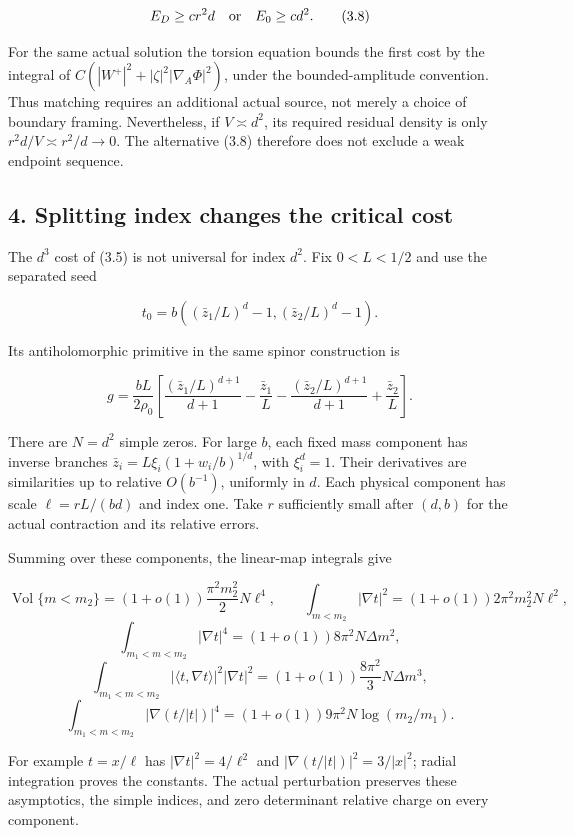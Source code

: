 \documentclass[
  11pt,
]{article}
\begin{document}
\[
 E_D\ge c r^2d\quad\hbox{or}\quad E_0\ge c d^2.
 \tag{3.8}
\]

For the same actual solution the torsion equation bounds the first cost
by the integral of \(C(|W^+|^2+|\zeta|^2|\nabla_A\Phi|^2)\), under the
bounded-amplitude convention. Thus matching requires an additional
actual source, not merely a choice of boundary framing. Nevertheless, if
\(V\asymp d^2\), its required residual density is only
\(r^2d/V\asymp r^2/d\to0\). The alternative (3.8) therefore does not
exclude a weak endpoint sequence.

\hypertarget{splitting-index-changes-the-critical-cost}{%
\subsection{4. Splitting index changes the critical
cost}\label{splitting-index-changes-the-critical-cost}}

The \(d^3\) cost of (3.5) is not universal for index \(d^2\). Fix
\(0<L<1/2\) and use the separated seed

\[
 t_0=b((\bar z_1/L)^d-1,(\bar z_2/L)^d-1).
 \tag{4.1}
\]

Its antiholomorphic primitive in the same spinor construction is

\[
 g=\frac{bL}{2\rho_0}\left[
 \frac{(\bar z_1/L)^{d+1}}{d+1}-\frac{\bar z_1}{L}
 -\frac{(\bar z_2/L)^{d+1}}{d+1}+\frac{\bar z_2}{L}\right].
 \tag{4.2}
\]

There are \(N=d^2\) simple zeros. For large \(b\), each fixed mass
component has inverse branches \(\bar z_i=L\xi_i(1+w_i/b)^{1/d}\), with
\(\xi_i^d=1\). Their derivatives are similarities up to relative
\(O(b^{-1})\), uniformly in \(d\). Each physical component has scale
\(\ell=rL/(bd)\) and index one. Take \(r\) sufficiently small after
\((d,b)\) for the actual contraction and its relative errors.

Summing over these components, the linear-map integrals give

\[
 \operatorname{Vol}\{m<m_2\}
 =(1+o(1))\frac{\pi^2m_2^2}{2}N\ell^4,\qquad
 \int_{m<m_2}|\nabla t|^2
 =(1+o(1))2\pi^2m_2^2N\ell^2,
 \tag{4.3}
\] \[
 \int_{m_1<m<m_2}|\nabla t|^4
 =(1+o(1))8\pi^2N\Delta m^2,
 \tag{4.4}
\] \[
 \int_{m_1<m<m_2}|\langle t,\nabla t\rangle|^2|\nabla t|^2
 =(1+o(1))\frac{8\pi^2}{3}N\Delta m^3,
 \tag{4.5}
\] \[
 \int_{m_1<m<m_2}|\nabla(t/|t|)|^4
 =(1+o(1))9\pi^2N\log(m_2/m_1).
 \tag{4.6}
\]

For example \(t=x/\ell\) has \(|\nabla t|^2=4/\ell^2\) and
\(|\nabla(t/|t|)|^2=3/|x|^2\); radial integration proves the constants.
The actual perturbation preserves these asymptotics, the simple indices,
and zero determinant relative charge on every component.
\end{document}
